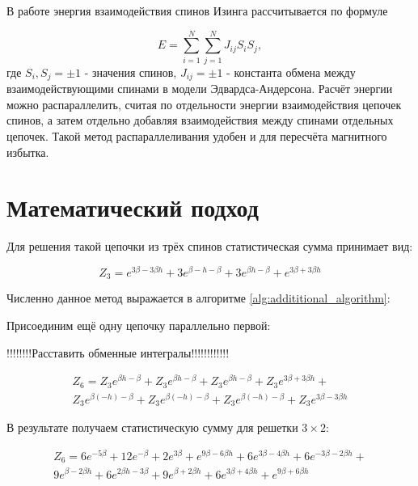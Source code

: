 \documentclass[10pt]{article}
\begin{document}
	В работе энергия взаимодействия спинов Изинга рассчитывается по формуле
	
	\begin{equation}
		E = \sum\limits_{i=1}^N \sum\limits_{j=1}^N J_{ij} S_i S_j,
	\end{equation}
	где $S_i, S_j = \pm 1$ - значения спинов, $J_{ij} = \pm 1$ - константа обмена между взаимодействующими спинами в модели Эдвардса-Андерсона. Расчёт энергии можно распараллелить, считая по отдельности энергии взаимодействия цепочек спинов, а затем отдельно добавляя взаимодействия между спинами отдельных цепочек. Такой метод распараллеливания удобен и для пересчёта магнитного избытка. 
	
	\section{Математический подход}
	
	Для решения такой цепочки из трёх спинов статистическая сумма принимает вид:
	
	\begin{equation}
		Z_3 = e^{3\beta - 3\beta h} + 3e^{\beta - h - \beta} + 3e^{\beta h - \beta} + e^{3\beta + 3\beta h}
		\label{eq:stat_3}
	\end{equation}
	
	
	Численно данное метод выражается в алгоритме \ref{alg:addititional_algorithm}:
	
	Присоединим ещё одну цепочку параллельно первой:
	
	!!!!!!!!Расставить обменные интегралы!!!!!!!!!!!!
	
	\begin{equation}
		\label{eq:stat_3_un}
		\begin{alignedat}{2}
			Z_6 = Z_3 e^{\beta  h-\beta }+Z_3 e^{\beta  h-\beta }+Z_3 e^{\beta  h-\beta }+Z_3 e^{3 \beta +3 \beta  h}+ \\
			Z_3 e^{\beta  (-h)-\beta }+Z_3 e^{\beta  (-h)-\beta }+Z_3 e^{\beta  (-h)-\beta }+Z_3 e^{3 \beta -3 \beta  h}
		\end{alignedat}
	\end{equation}
	
	В результате получаем статистическую сумму для решетки $3 \times 2$:
	
	\begin{equation}
		\label{eq:stat_3_res}
		\begin{alignedat}{2}
			Z_6 = 6 e^{-5 \beta }+12 e^{-\beta }+2 e^{3 \beta }+e^{9 \beta -6 \beta  h}+6 e^{3 \beta -4 \beta  h}+6 e^{-3 \beta -2 \beta  h}+\\
			9 e^{\beta -2 \beta  h}+6 e^{2 \beta  h-3 \beta }+9 e^{\beta +2 \beta  h}+6 e^{3 \beta +4 \beta  h}+e^{9 \beta +6 \beta  h}
		\end{alignedat}
	\end{equation}
	
\end{document}
